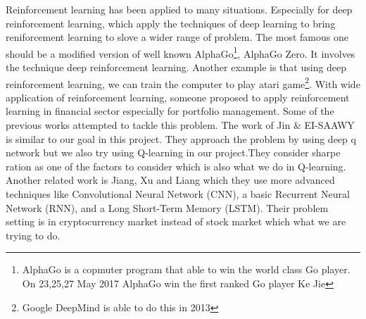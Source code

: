 Reinforcement learning has been applied to many situations.
Especially for deep reinforcement learning, which apply the techniques of deep learning to bring reniforcement learning to slove a wider range of problem.\cite{arulkumaran2017brief} The most famous one should be a modified version of well known AlphaGo\footnote{AlphaGo is a copmuter program that able to win the world class Go player. On 23,25,27 May 2017 AlphaGo win the first ranked Go player Ke Jie}, AlphaGo Zero. It involves the technique deep reinforcement learning. Another example is that using deep reinforcement learning, we can train the computer to play atari game\footnote{Google DeepMind is able to do this in 2013}.\cite{Playing} With wide application of reinforcement learning, someone proposed to apply reinforcement learning in financial sector especially for portfolio management. Some of the previous works attempted to tackle this problem. The work of Jin \& EI-SAAWY \cite{jinportfolio} is similar to our goal in this project. They approach the problem by using deep q network but we also try using Q-learning in our project.They consider sharpe ration as one of the factors to consider  which is also what we do in Q-learning. Another related work is Jiang, Xu and Liang\cite{du2009algorithm} which they use more advanced techniques like Convolutional Neural Network (CNN), a basic Recurrent Neural Network (RNN), and a Long Short-Term Memory (LSTM). Their problem setting is in cryptocurrency market instead of stock market which what we are trying to do.
